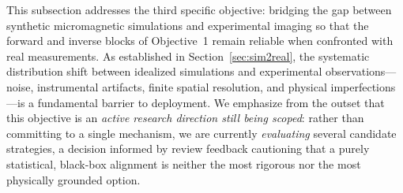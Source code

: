 \documentclass[letterpaper, 12, one column]{article}
\begin{document}
This subsection addresses the third specific objective: bridging the gap between synthetic micromagnetic simulations and experimental imaging so that the forward and inverse blocks of Objective~1 remain reliable when confronted with real measurements. As established in Section~\ref{sec:sim2real}, the systematic distribution shift between idealized simulations and experimental observations---noise, instrumental artifacts, finite spatial resolution, and physical imperfections---is a fundamental barrier to deployment. We emphasize from the outset that this objective is an \emph{active research direction still being scoped}: rather than committing to a single mechanism, we are currently \emph{evaluating} several candidate strategies, a decision informed by review feedback cautioning that a purely statistical, black-box alignment is neither the most rigorous nor the most physically grounded option.
\end{document}
